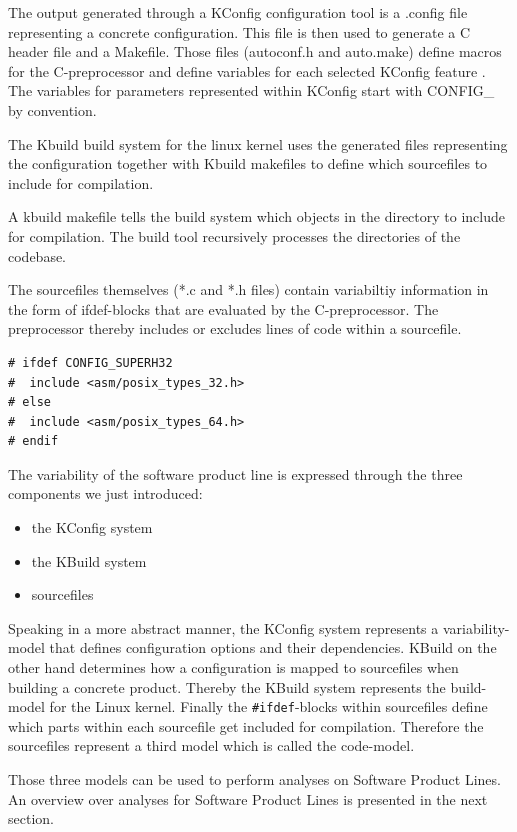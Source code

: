 \documentclass[a4paper]{article}
\begin{document}
The output generated through a KConfig configuration tool is a .config file representing a concrete configuration. This file is then used to generate a C header file and a Makefile. Those files (autoconf.h and auto.make) define macros for the C-preprocessor and define variables for each selected KConfig feature \cite{Tartler:2011:FCC:1966445.1966451}. The variables for parameters represented within KConfig start with CONFIG\_ by convention.

The Kbuild build system for the linux kernel uses the generated files representing the configuration together with Kbuild makefiles to define which sourcefiles to include for compilation. 

A kbuild makefile tells the build system which objects in the directory to include for compilation. The build tool recursively processes the directories of the codebase.

The sourcefiles themselves (*.c and *.h files) contain variabiltiy information in the form of ifdef-blocks that are evaluated by the C-preprocessor. The preprocessor thereby includes or excludes lines of code within a  sourcefile.

\begin{lstlisting}
# ifdef CONFIG_SUPERH32
#  include <asm/posix_types_32.h>
# else
#  include <asm/posix_types_64.h>
# endif
\end{lstlisting}

The variability of the software product line is expressed through the three components we just introduced:

\begin{itemize}
	\item the KConfig system
	\item the KBuild system
	\item sourcefiles
\end{itemize}

Speaking in a more abstract manner, the KConfig system represents a variability-model that defines configuration options and their dependencies. KBuild on the other hand determines how a configuration is mapped to sourcefiles when building a concrete product. Thereby the KBuild system represents the build-model for the Linux kernel. Finally the \texttt{\#ifdef}-blocks within sourcefiles define which parts within each sourcefile get included for compilation. Therefore the sourcefiles represent a third model which is called the code-model.

Those three models can be used to perform analyses on Software Product Lines. An overview over analyses for Software Product Lines is presented in the next section.
\end{document}

